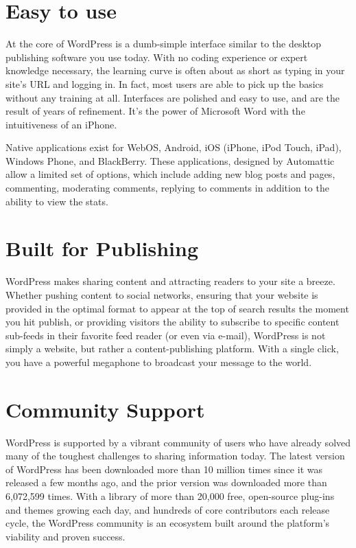 \section{Easy to use}



At the core of WordPress is a dumb-simple interface similar to the desktop publishing software you use today. With no coding experience or expert knowledge necessary, the learning curve is often about as short as typing in your site’s URL and logging in. In fact, most users are able to pick up the basics without any training at all. Interfaces are polished and easy to use, and are the result of years of refinement. It’s the power of Microsoft Word with the intuitiveness of an iPhone.

Native applications exist for WebOS, Android, iOS (iPhone, iPod Touch, iPad), Windows Phone, and BlackBerry. These applications, designed by Automattic allow a limited set of options, which include adding new blog posts and pages, commenting, moderating comments, replying to comments in addition to the ability to view the stats.



\section{Built for Publishing}

WordPress makes sharing content and attracting readers to your site a breeze. Whether pushing content to social networks, ensuring that your website is provided in the optimal format to appear at the top of search results the moment you hit publish, or providing visitors the ability to subscribe to specific content sub-feeds in their favorite feed reader (or even via e-mail), WordPress is not simply a website, but rather a content-publishing platform. With a single click, you have a powerful megaphone to broadcast your message to the world.

\section{Community Support}

WordPress is supported by a vibrant community of users who have already solved many of the toughest challenges to sharing information today. The latest version of WordPress has been downloaded more than 10 million times since it was released a few months ago, and the prior version was downloaded more than 6,072,599 times. With a library of more than 20,000 free, open-source plug-ins and themes growing each day, and hundreds of core contributors each release cycle, the WordPress community is an ecosystem built around the platform’s viability and proven success.


